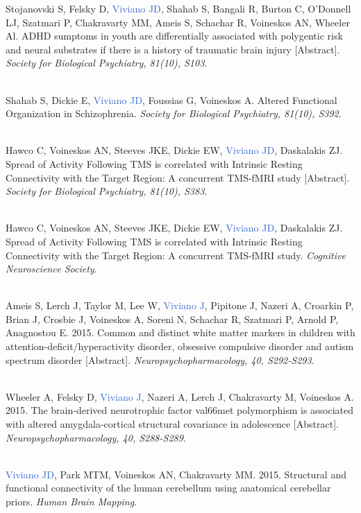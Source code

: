 \documentclass[a4paper,11pt,oneside]{book}
\begin{document}
\begin{flushleft}
Stojanovski S, Felsky D, \textcolor{highlight}{Viviano JD}, Shahab S, Bangali R, Burton C, O'Donnell LJ, Szatmari P, Chakravarty MM, Ameis S, Schachar R, Voineskos AN, Wheeler Al. ADHD sumptoms in youth are differentially associated with polygentic risk and neural substrates if there is a history of traumatic brain injury [Abstract]. \textit{Society for Biological Psychiatry, 81(10), S103}. \\\

Shahab S, Dickie E, \textcolor{highlight}{Viviano JD}, Foussias G, Voineskos A. Altered Functional Organization in Schizophrenia. \textit{Society for Biological Psychiatry, 81(10), S392}. \\\

Hawco C, Voineskos AN, Steeves JKE, Dickie EW, \textcolor{highlight}{Viviano JD}, Daskalakis ZJ. Spread of Activity Following TMS is correlated with Intrinsic Resting Connectivity with the Target Region: A concurrent TMS-fMRI study [Abstract]. \textit{Society for Biological Psychiatry, 81(10), S383}. \\\

Hawco C, Voineskos AN, Steeves JKE, Dickie EW, \textcolor{highlight}{Viviano JD}, Daskalakis ZJ. Spread of Activity Following TMS is correlated with Intrinsic Resting Connectivity with the Target Region: A concurrent TMS-fMRI study. \textit{Cognitive Neuroscience Society}. \\\

Ameis S, Lerch J, Taylor M, Lee W, \textcolor{highlight}{Viviano J}, Pipitone J, Nazeri A, Croarkin P, Brian J, Crosbie J, Voineskos A, Soreni N, Schachar R, Szatmari P, Arnold P, Anagnostou E. 2015. Common and distinct white matter markers in children with attention-deficit/hyperactivity disorder, obsessive compulsive disorder and autism spectrum disorder [Abstract]. \textit{Neuropsychopharmacology, 40, S292-S293}. \\\

Wheeler A, Felsky D, \textcolor{highlight}{Viviano J}, Nazeri A, Lerch J, Chakravarty M, Voineskos A. 2015. The brain-derived neurotrophic factor val66met polymorphism is associated with altered amygdala-cortical structural covariance in adolescence [Abstract]. \textit{Neuropsychopharmacology, 40, S288-S289}. \\\

\textcolor{highlight}{Viviano JD}, Park MTM, Voineskos AN, Chakravarty MM. 2015. Structural and functional connectivity of the human cerebellum using anatomical cerebellar priors. \textit{Human Brain Mapping}. \\\


\end{flushleft}
\end{document}
